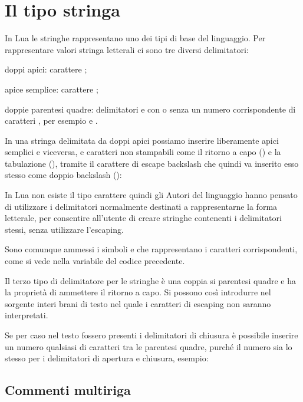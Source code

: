 
\chapter{Il tipo stringa}

In Lua le stringhe rappresentano uno dei tipi di base del linguaggio.
Per rappresentare valori stringa letterali ci sono tre diversi delimitatori:
\begin{compactitemize}
\item doppi apici: carattere ;
\item apice semplice: carattere ;
\item doppie parentesi quadre: delimitatori \key{[[} e \key{]]} con o senza un
numero corrispondente di caratteri \key{=}, per esempio \key{[==[} e \key{]==]}.
\end{compactitemize}

In una stringa delimitata da doppi apici possiamo inserire liberamente apici
semplici e viceversa, e caratteri non stampabili come il ritorno a capo
() e la tabulazione (), tramite il carattere di escape backslash
che quindi va inserito esso stesso come doppio backslash (\cs{\textbackslash}):

In Lua non esiste il tipo carattere quindi gli Autori del linguaggio hanno
pensato di utilizzare i delimitatori normalmente destinati a rappresentarne la
forma letterale, per consentire all'utente di creare stringhe contenenti i
delimitatori stessi, senza utilizzare l'escaping.

Sono comunque ammessi i simboli  e 
che rappresentano i caratteri corrispondenti, come si vede nella variabile
 del codice precedente.

Il terzo tipo di delimitatore per le stringhe è una coppia si parentesi quadre e
ha la proprietà di ammettere il ritorno a capo. Si possono così introdurre nel
sorgente interi brani di testo nel quale i caratteri di escaping non saranno
interpretati.

Se per caso nel testo fossero presenti i delimitatori di chiusura è possibile
inserire un numero qualsiasi di caratteri \key{=} tra le parentesi quadre,
purché il numero sia lo stesso per i delimitatori di apertura e chiusura,
esempio:


\section{Commenti multiriga}

